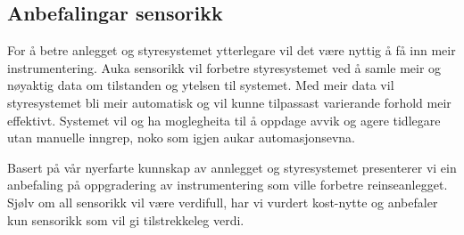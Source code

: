 \subsection{Anbefalingar sensorikk}

For å betre anlegget og styresystemet ytterlegare vil det være nyttig å få inn meir instrumentering. 
Auka sensorikk vil forbetre styresystemet ved å samle meir og nøyaktig data om tilstanden og ytelsen til systemet. 
Med meir data vil styresystemet bli meir automatisk og vil kunne tilpassast varierande forhold meir effektivt. 
Systemet vil og ha moglegheita til å oppdage avvik og agere tidlegare utan manuelle inngrep, noko som igjen aukar automasjonsevna.

Basert på vår nyerfarte kunnskap av annlegget og styresystemet presenterer vi ein
anbefaling på oppgradering av instrumentering som ville forbetre reinseanlegget. 
Sjølv om all sensorikk vil være verdifull, har vi vurdert kost-nytte og anbefaler kun sensorikk som vil gi tilstrekkeleg verdi.

